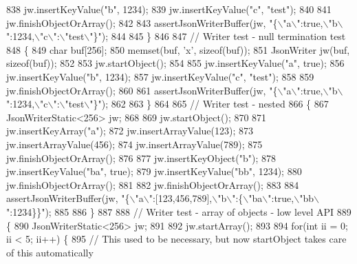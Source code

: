 \begin{DoxyCode}
{{{{{{{{838         jw.insertKeyValue(\textcolor{stringliteral}{"b"}, 1234);
839         jw.insertKeyValue(\textcolor{stringliteral}{"c"}, \textcolor{stringliteral}{"test"});
840 
841         jw.finishObjectOrArray();
842 
843         assertJsonWriterBuffer(jw, \textcolor{stringliteral}{"\{\(\backslash\)"a\(\backslash\)":true,\(\backslash\)"b\(\backslash\)":1234,\(\backslash\)"c\(\backslash\)":\(\backslash\)"test\(\backslash\)"\}"});
844 
845     \}
846 
847     \textcolor{comment}{// Writer test - null termination test}
848     \{
849         \textcolor{keywordtype}{char} buf[256];
850         memset(buf, \textcolor{charliteral}{'x'}, \textcolor{keyword}{sizeof}(buf));
851         JsonWriter jw(buf, \textcolor{keyword}{sizeof}(buf));
852 
853         jw.startObject();
854 
855         jw.insertKeyValue(\textcolor{stringliteral}{"a"}, \textcolor{keyword}{true});
856         jw.insertKeyValue(\textcolor{stringliteral}{"b"}, 1234);
857         jw.insertKeyValue(\textcolor{stringliteral}{"c"}, \textcolor{stringliteral}{"test"});
858 
859         jw.finishObjectOrArray();
860 
861         assertJsonWriterBuffer(jw, \textcolor{stringliteral}{"\{\(\backslash\)"a\(\backslash\)":true,\(\backslash\)"b\(\backslash\)":1234,\(\backslash\)"c\(\backslash\)":\(\backslash\)"test\(\backslash\)"\}"});
862 
863     \}
864 
865     \textcolor{comment}{// Writer test - nested}
866     \{
867         JsonWriterStatic<256> jw;
868 
869         jw.startObject();
870 
871         jw.insertKeyArray(\textcolor{stringliteral}{"a"});
872         jw.insertArrayValue(123);
873         jw.insertArrayValue(456);
874         jw.insertArrayValue(789);
875         jw.finishObjectOrArray();
876 
877         jw.insertKeyObject(\textcolor{stringliteral}{"b"});
878         jw.insertKeyValue(\textcolor{stringliteral}{"ba"}, \textcolor{keyword}{true});
879         jw.insertKeyValue(\textcolor{stringliteral}{"bb"}, 1234);
880         jw.finishObjectOrArray();
881 
882         jw.finishObjectOrArray();
883 
884         assertJsonWriterBuffer(jw, \textcolor{stringliteral}{"\{\(\backslash\)"a\(\backslash\)":[123,456,789],\(\backslash\)"b\(\backslash\)":\{\(\backslash\)"ba\(\backslash\)":true,\(\backslash\)"bb\(\backslash\)":1234\}\}"});
885 
886     \}
887 
888     \textcolor{comment}{// Writer test - array of objects - low level API}
889     \{
890         JsonWriterStatic<256> jw;
891 
892         jw.startArray();
893 
894         \textcolor{keywordflow}{for}(\textcolor{keywordtype}{int} ii = 0; ii < 5; ii++) \{
895             \textcolor{comment}{// This used to be necessary, but now startObject takes care of this automatically}
}}}}}}}}
\end{DoxyCode}
